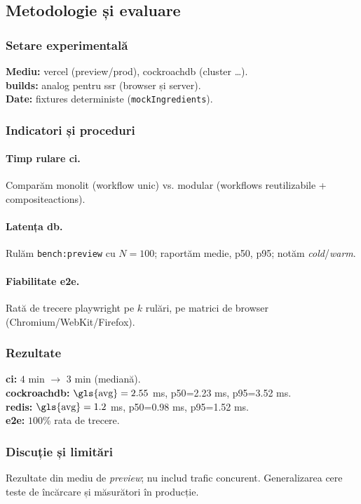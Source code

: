 \subsection{Metodologie și evaluare}\label{ch:evaluare}

\subsubsection{Setare experimentală}
\textbf{Mediu:} \gls{vercel} (preview/prod), \gls{cockroachdb} (cluster \dots).\\
\textbf{\Glspl{build}:} \gls{analog} pentru \acrfull{ssr} (browser și server).\\
\textbf{Date:} fixtures deterministe (\texttt{mockIngredients}).

\subsubsection{Indicatori și proceduri}

\paragraph{Timp rulare \acrfull{ci}.}
Comparăm monolit (\gls{workflow} unic) vs. modular (\glspl{workflow} reutilizabile + \glspl{compositeaction}).

\paragraph{Latența \acrfull{db}.}
Rulăm \texttt{bench:preview} cu \(N=100\); raportăm medie, \acrshort{p50}, \acrshort{p95}; notăm \textit{cold}/\textit{warm}.

\paragraph{Fiabilitate \acrfull{e2e}.}
Rată de trecere \gls{playwright} pe \(k\) rulări, pe matrici de browser (Chromium/WebKit/Firefox).

\subsubsection{Rezultate}
\textbf{\acrshort{ci}:} \(4\) min \(\rightarrow\) \(3\) min (mediană).\\
\textbf{\gls{cockroachdb}:} \(\text{\gls{avg}}=2.55\) ms, \acrshort{p50}=2.23 ms, \acrshort{p95}=3.52 ms.\\
\textbf{\gls{redis}:} \(\text{\gls{avg}}=1.2\) ms, \acrshort{p50}=0.98 ms, \acrshort{p95}=1.52 ms.\\
\textbf{\acrshort{e2e}:} \(100\)\% rata de trecere.

\subsubsection{Discuție și limitări}
Rezultate din mediu de \textit{preview}; nu includ trafic concurent. Generalizarea cere teste de încărcare și măsurători în producție.
